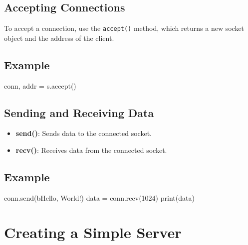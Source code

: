 \documentclass[
  letterpaper,
  DIV=11,
  numbers=noendperiod]{scrreprt}
\newenvironment{Shaded}{\begin{snugshade}}{\end{snugshade}}
\newcommand{\BuiltInTok}[1]{\textcolor[rgb]{0.00,0.23,0.31}{#1}}
\newcommand{\DecValTok}[1]{\textcolor[rgb]{0.68,0.00,0.00}{#1}}
\newcommand{\NormalTok}[1]{\textcolor[rgb]{0.00,0.23,0.31}{#1}}
\newcommand{\OperatorTok}[1]{\textcolor[rgb]{0.37,0.37,0.37}{#1}}
\newcommand{\StringTok}[1]{\textcolor[rgb]{0.13,0.47,0.30}{#1}}
\providecommand{\tightlist}{%
  \setlength{\itemsep}{0pt}\setlength{\parskip}{0pt}}\usepackage{longtable,booktabs,array}
\begin{document}
\subsection{Accepting Connections}\label{accepting-connections}

To accept a connection, use the \texttt{accept()} method, which returns
a new socket object and the address of the client.

\subsection{Example}\label{example-55}

\begin{Shaded}
\begin{Highlighting}[]
\NormalTok{conn, addr }\OperatorTok{=}\NormalTok{ s.accept()}
\end{Highlighting}
\end{Shaded}

\subsection{Sending and Receiving
Data}\label{sending-and-receiving-data}

\begin{itemize}
\tightlist
\item
  \textbf{send()}: Sends data to the connected socket.
\item
  \textbf{recv()}: Receives data from the connected socket.
\end{itemize}

\subsection{Example}\label{example-56}

\begin{Shaded}
\begin{Highlighting}[]
\NormalTok{conn.send(}\StringTok{b\textquotesingle{}Hello, World!\textquotesingle{}}\NormalTok{)}
\NormalTok{data }\OperatorTok{=}\NormalTok{ conn.recv(}\DecValTok{1024}\NormalTok{)}
\BuiltInTok{print}\NormalTok{(data)}
\end{Highlighting}
\end{Shaded}

\section{Creating a Simple Server}\label{creating-a-simple-server}
\end{document}
